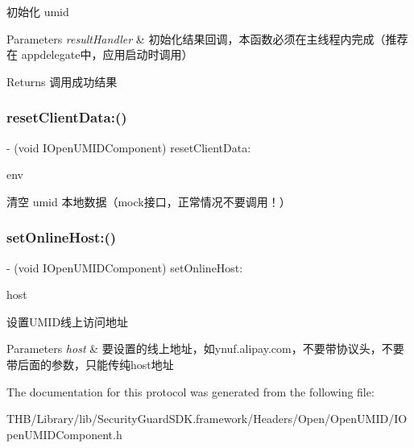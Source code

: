 初始化 umid


\begin{DoxyParams}{Parameters}
{\em result\+Handler} & 初始化结果回调，本函数必须在主线程内完成（推荐在 appdelegate中，应用启动时调用）\\
\hline
\end{DoxyParams}
\begin{DoxyReturn}{Returns}
调用成功结果 
\end{DoxyReturn}
\mbox{\label{protocol_i_open_u_m_i_d_component_01-p_a7690ec941a6f7877ea574bff0a0b88f6}} 
\subsubsection{\texorpdfstring{reset\+Client\+Data\+:()}{resetClientData:()}}
{\footnotesize\ttfamily -\/ (void I\+Open\+U\+M\+I\+D\+Component) reset\+Client\+Data\+: \begin{DoxyParamCaption}\item[{(S\+D\+P\+\_\+\+E\+N\+V\+I\+R\+O\+N\+M\+E\+NT)}]{env }\end{DoxyParamCaption}}

清空 umid 本地数据（mock接口，正常情况不要调用！） \mbox{\label{protocol_i_open_u_m_i_d_component_01-p_a566a947de77796e00a566f76bd997a94}} 
\subsubsection{\texorpdfstring{set\+Online\+Host\+:()}{setOnlineHost:()}}
{\footnotesize\ttfamily -\/ (void I\+Open\+U\+M\+I\+D\+Component) set\+Online\+Host\+: \begin{DoxyParamCaption}\item[{(N\+S\+String $\ast$)}]{host }\end{DoxyParamCaption}}

设置\+U\+M\+I\+D线上访问地址


\begin{DoxyParams}{Parameters}
{\em host} & 要设置的线上地址，如ynuf.\+alipay.\+com，不要带协议头，不要带后面的参数，只能传纯host地址 \\
\hline
\end{DoxyParams}


The documentation for this protocol was generated from the following file\+:\begin{DoxyCompactItemize}
\item 
T\+H\+B/\+Library/lib/\+Security\+Guard\+S\+D\+K.\+framework/\+Headers/\+Open/\+Open\+U\+M\+I\+D/I\+Open\+U\+M\+I\+D\+Component.\+h\end{DoxyCompactItemize}
